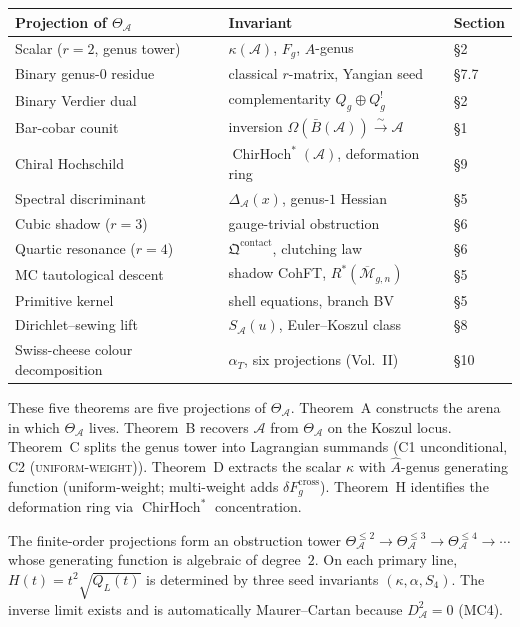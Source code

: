 \documentclass[11pt,reqno]{amsart}
\theoremstyle{definition}
\theoremstyle{remark}
\providecommand{\cA}{\mathcal{A}}
\providecommand{\cM}{\mathcal{M}}
\providecommand{\barB}{\bar{B}}
\numberwithin{equation}{section}
\begin{document}
\medskip
\begin{center}
\small
\renewcommand{\arraystretch}{1.15}
\begin{tabular}{lll}
\textbf{Projection of $\Theta_\cA$} & \textbf{Invariant} & \textbf{Section}\\
\hline
Scalar ($r=2$, genus tower) & $\kappa(\cA)$, $F_g$, $\hat A$-genus & \S2\\[1pt]
Binary genus-$0$ residue & classical $r$-matrix, Yangian seed & \S7.7\\[1pt]
Binary Verdier dual & complementarity $Q_g\oplus Q_g^!$ & \S2\\[1pt]
Bar-cobar counit & inversion $\Omega(\barB(\cA))\xrightarrow{\sim}\cA$ & \S1\\[1pt]
Chiral Hochschild & $\operatorname{ChirHoch}^*(\cA)$, deformation ring & \S9\\[1pt]
Spectral discriminant & $\Delta_\cA(x)$, genus-$1$ Hessian & \S5\\[1pt]
Cubic shadow ($r=3$) & gauge-trivial obstruction & \S6\\[1pt]
Quartic resonance ($r=4$) & $\mathfrak Q^{\mathrm{contact}}$, clutching law & \S6\\[1pt]
MC tautological descent & shadow CohFT, $R^*(\overline{\cM}_{g,n})$ & \S5\\[1pt]
Primitive kernel & shell equations, branch BV & \S5\\[1pt]
Dirichlet--sewing lift & $S_\cA(u)$, Euler--Koszul class & \S8\\[1pt]
Swiss-cheese colour decomposition & $\alpha_T$, six projections (Vol.~II) & \S10
\end{tabular}
\end{center}
\medskip

\noindent
These five theorems are five projections of $\Theta_\cA$. Theorem~A
constructs the arena in which $\Theta_\cA$ lives. Theorem~B
recovers $\cA$ from $\Theta_\cA$ on the Koszul locus. Theorem~C
splits the genus tower into Lagrangian summands (C1 unconditional, C2
\textsc{(uniform-weight)}). Theorem~D extracts the scalar $\kappa$
with $\hat A$-genus generating function (uniform-weight; multi-weight
adds $\delta F_g^{\mathrm{cross}}$). Theorem~H identifies the
deformation ring via $\operatorname{ChirHoch}^*$ concentration.

The finite-order projections form an obstruction tower
$\Theta_\cA^{\le 2}\to\Theta_\cA^{\le 3}\to\Theta_\cA^{\le 4}\to\cdots$
whose generating function is algebraic of degree~$2$. On each
primary line,
$H(t)=t^2\sqrt{Q_L(t)}$ is determined by three seed invariants
$(\kappa,\alpha,S_4)$. The inverse limit exists and is automatically
Maurer--Cartan because $D_\cA^2=0$ (MC4).
\end{document}
